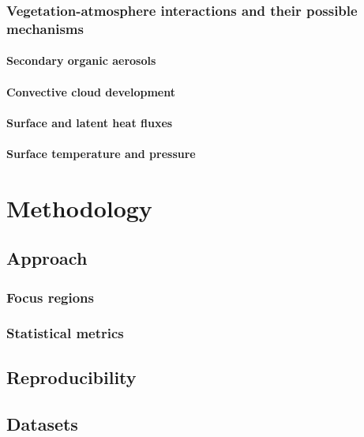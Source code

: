 \documentclass[12pt,a4paper,twoside]{book}
\begin{document}
\subsection{Vegetation-atmosphere interactions and their possible mechanisms}

\subsubsection{Secondary organic aerosols}

\subsubsection{Convective cloud development}

\subsubsection{Surface and latent heat fluxes}

\subsubsection{Surface temperature and pressure}

	\chapter{Methodology}

\section{Approach}

\subsection{Focus regions}

\subsection{Statistical metrics}

\section{Reproducibility}

\section{Datasets}
\end{document}
